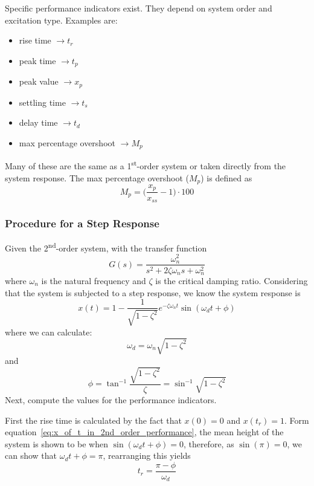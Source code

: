 \documentclass[12pt,letter]{article}
\begin{document}
Specific performance indicators exist. They depend on system order and excitation type. Examples are: 
\begin{itemize}
	\item rise time $ \rightarrow t_r$
	\item peak time  $ \rightarrow t_p$
	\item peak value  $ \rightarrow x_p$
	\item settling time $ \rightarrow t_s$
	\item delay time  $ \rightarrow t_d$
	\item max percentage overshoot $ \rightarrow M_p$
\end{itemize}
Many of these are the same as a 1\textsuperscript{st}-order system or taken directly from the system response. The max percentage overshoot ($M_p$) is defined as 
\begin{equation}
M_p = \bigg( \frac{x_p}{x_{ss}}-1 \bigg) \cdot 100
\end{equation}

\subsubsection{Procedure for a Step Response}

Given the 2\textsuperscript{nd}-order system, with the transfer function
\begin{equation}
G(s) = \frac{\omega_n^2}{s^2 + 2 \zeta \omega_n s + \omega_n^2}
\end{equation}
where $\omega_n$ is the natural frequency and $\zeta$ is the critical damping ratio. Considering that the system is subjected to a step response, we know the system response is
\begin{equation}
x(t) = 1 - \frac{1}{\sqrt{1-\zeta^2}} e^{-\zeta \omega_n t} \sin (\omega_d t + \phi)
\label{eq:x_of_t_in_2nd_order_performance}
\end{equation}
where we can calculate:
\begin{equation}
\omega_d = \omega_n \sqrt{1-\zeta^2}
\end{equation}
and
\begin{equation}
\phi = \tan^{-1} \frac{\sqrt{1-\zeta^2}}{\zeta} = \sin^{-1} \sqrt{1-\zeta^2}
\label{eq:tan_in_performance_indicators}
\end{equation}
Next, compute the values for the performance indicators. 

First the rise time is calculated by the fact that $x(0) = 0$ and $x(t_r)=1$. Form equation~\ref{eq:x_of_t_in_2nd_order_performance}, the mean height of the system is shown to be when $ \sin (\omega_d t + \phi) = 0$, therefore, as $\sin(\pi)=0$, we can show that $\omega_d t + \phi = \pi$, rearranging this yields 
\begin{equation}
t_r = \frac{\pi - \phi}{\omega_d}
\end{equation}
\end{document}
